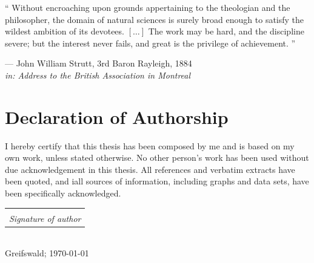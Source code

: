 \documentclass[
	10pt,
	twoside,
	chapterinoneline,
	onehalfspacing, %
	nolistspacing, %
	parskip, %
	headsepline, %
	english,
]{MastersDoctoralThesis} %
\makeatletter
\newcommand{\sign}[1]{%
  \begin{tabular}[t]{@{}c@{}}
  \makebox[1.5in]{\dotfill}\\
  \strut\emph{#1}\strut%
  \end{tabular}%
}
\makeatother
\begin{document}

	\vspace*{0.33\textheight}
	
	\noindent\enquote{%
		Without encroaching upon grounds appertaining to the theologian and the
		philosopher, the domain of natural sciences is surely broad enough to
		satisfy the wildest ambition of its devotees. $\left[\dots\right]$
		The work may be hard, and the discipline severe; but the interest never
		fails, and great is the privilege of achievement.
	}\bigbreak%
	
	\begin{flushright}
		--- John William Strutt, 3rd Baron Rayleigh, 1884\\
		\small\emph{in: Address to the British Association in Montreal}
	\end{flushright}
	


	\chapter*{Declaration of Authorship}

		I hereby certify that this thesis has been composed by me and is based on 
		my own work, unless stated otherwise.	No other person’s work has been used
		without due acknowledgement in this thesis.
		All references and verbatim extracts have been quoted, and iall sources of
		information, including graphs and data sets, have been specifically
		acknowledged.\\[2.0cm]

	\begin{flushright}
		\sign{Signature of author}\\
		Greifswald; \today
	\end{flushright}
\end{document}
